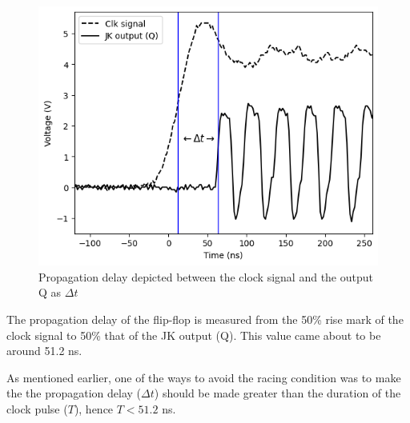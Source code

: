 \begin{figure}[H]
    \centering
    \includegraphics[width=1\columnwidth]{images/propagation.png}
    \caption{Propagation delay depicted between the clock signal and the output Q as $\Delta t$}
\end{figure}

The propagation delay of the flip-flop is measured from the 50\% rise mark of the clock signal to 50\% that of the JK output (Q). This value came about to be around 51.2 ns. 

As mentioned earlier, one of the ways to avoid the racing condition was to make the the propagation delay ($\Delta t$) should be made greater than the duration of the clock pulse ($T$), hence $T < 51.2$ ns.
\newpage